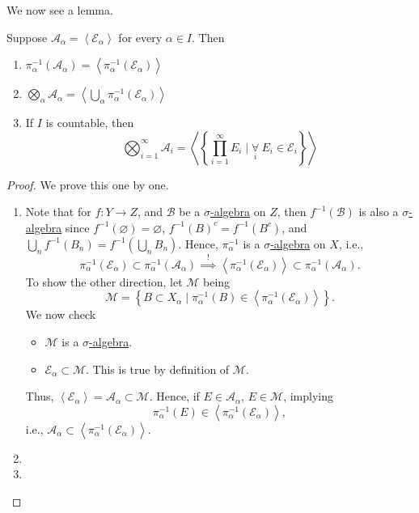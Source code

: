 We now see a lemma.
\begin{lemma}
	Suppose \(\mathcal{A} _\alpha  = \left< \mathcal{E} _\alpha  \right> \) for every \(\alpha \in I\). Then
	\begin{enumerate}[(1)]
		\item \(\pi _\alpha ^{-1} (\mathcal{A} _\alpha ) = \left< \pi ^{-1} _\alpha (\mathcal{E} _\alpha ) \right> \)
		\item \(\bigotimes_\alpha  \mathcal{A} _\alpha = \left< \bigcup_{\alpha} \pi _\alpha ^{-1} (\mathcal{E} _\alpha )\right> \)
		\item If \(I\) is countable, then
		      \[
			      \bigotimes_{i=1}^{\infty }\mathcal{A} _i = \left< \left\{\prod\limits_{i=1}^{\infty} E_{i} \mid \underset{i}{\forall}\ E_{i}\in \mathcal{E} _{i}\right\} \right>
		      \]
	\end{enumerate}
\end{lemma}
\begin{proof}
	We prove this one by one.
	\begin{enumerate}[(1)]
		\item Note that for \(f\colon Y\to Z\), and \(\mathcal{B} \) be a \hyperref[def:sigma-algebra]{\(\sigma\)-algebra} on \(Z\), then
		      \(f^{-1} (\mathcal{B} )\) is also a \hyperref[def:sigma-algebra]{\(\sigma\)-algebra} since
		      \(f^{-1} (\varnothing ) = \varnothing\), \(f^{-1} (B)^{c} = f^{-1} (B^{c} )\), and \(\bigcup_{n} f^{-1} (B_{n}) = f^{-1} (\bigcup_{n}B_{n})\).
		      Hence, \(\pi ^{-1}_\alpha \) is a \hyperref[def:sigma-algebra]{\(\sigma\)-algebra} on \(X\), i.e.,
		      \[
			      \pi _\alpha ^{-1} (\mathcal{E} _\alpha )\subset \pi _\alpha ^{-1} (\mathcal{A} _\alpha )\overset{\hyperref[lma:lec2-1]{!}}{\implies} \left< \pi ^{-1} _\alpha (\mathcal{E} _\alpha ) \right> \subset \pi _\alpha ^{-1} (\mathcal{A} _\alpha ).
		      \]
		      To show the other direction, let \(\mathcal{M} \) being
		      \[
			      \mathcal{M} = \left\{B\subset X_\alpha  \mid \pi _\alpha ^{-1} (B)\in \left< \pi _\alpha ^{-1} (\mathcal{E} _\alpha ) \right> \right\}.
		      \]
		      We now check
		      \begin{itemize}
			      \item \(\mathcal{M} \) is a \hyperref[def:sigma-algebra]{\(\sigma\)-algebra}. 
			      \item \(\mathcal{E} _\alpha \subset \mathcal{M}\). This is true by definition of \(\mathcal{M} \).
		      \end{itemize}
		      Thus, \(\left< \mathcal{E} _\alpha \right> = \mathcal{A} _\alpha \subset \mathcal{M} \). Hence,
		      if \(E\in \mathcal{A} _\alpha \), \(E\in \mathcal{M} \), implying
		      \[
			      \pi _\alpha ^{-1} (E)\in \left< \pi _\alpha ^{-1} (\mathcal{E} _\alpha ) \right>,
		      \]
		      i.e., \(\mathcal{A} _\alpha \subset \left< \pi_\alpha ^{-1} (\mathcal{E} _\alpha ) \right> \).
		\item {}
		\item {}
	\end{enumerate}
\end{proof}

